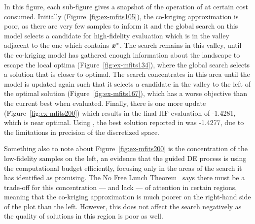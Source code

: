 In this figure, each sub-figure gives a snapshot of the operation of \AlgName{} at certain cost consumed. Initially (Figure~\ref{fig:ex-mfits105}), the co-kriging approximation is poor, as there are very few samples to inform it and the global search on this model selects a candidate for high-fidelity evaluation which is in the valley adjacent to the one which contains $\boldsymbol{x}^*$. The search remains in this valley, until the co-kriging model has gathered enough information about the landscape to escape the local optima (Figure~\ref{fig:ex-mfits134}), where the global search selects a solution that is closer to optimal. The search concentrates in this area until the model is updated again such that it selects a candidate in the valley to the left of the optimal solution (Figure~\ref{fig:ex-mfits167}), which has a worse objective than the current best when evaluated. Finally, there is one more update (Figure~\ref{fig:ex-mfits200}) which results in the final HF evaluation of -1.4281, which is near optimal. Using \motos{}, the best solution reported in \cite{xu2016mo2tos} was -1.4277, due to the limitations in precision of the discretized space. 

Something also to note about Figure~\ref{fig:ex-mfits200} is the concentration of the low-fidelity samples on the left, an evidence that the guided DE process is using the computational budget efficiently, focusing only in the areas of the search it has identified as promising. The No Free Lunch Theorem~\cite{wolpert1997no} says there must be a trade-off for this concentration --- and lack --- of attention in certain regions, meaning that the co-kriging approximation is much poorer on the right-hand side of the plot than the left. However, this does not affect the search negatively as the quality of solutions in this region is poor as well.
